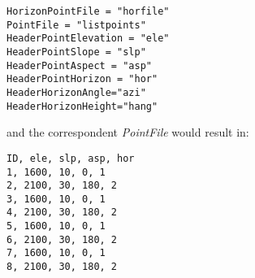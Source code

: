 \footnotesize{
\begin{verbatim}
HorizonPointFile = "horfile"
PointFile = "listpoints"
HeaderPointElevation = "ele"
HeaderPointSlope = "slp"
HeaderPointAspect = "asp"
HeaderPointHorizon = "hor"
HeaderHorizonAngle="azi"
HeaderHorizonHeight="hang"
\end{verbatim}
}

\noindent and the correspondent {\it PointFile} would result in:
\footnotesize{
\begin{verbatim}
ID, ele, slp, asp, hor
1, 1600, 10, 0, 1
2, 2100, 30, 180, 2
3, 1600, 10, 0, 1
4, 2100, 30, 180, 2
5, 1600, 10, 0, 1
6, 2100, 30, 180, 2
7, 1600, 10, 0, 1
8, 2100, 30, 180, 2
\end{verbatim}
}


